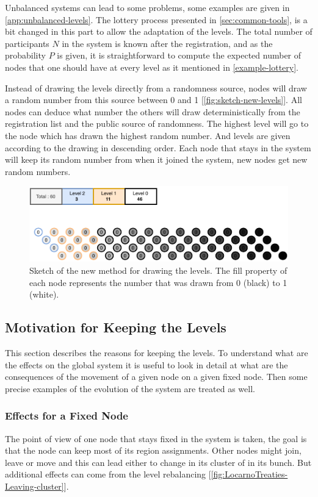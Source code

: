 \documentclass[a4paper,11pt,oneside]{report}
\begin{document}
Unbalanced systems can lead to some problems, some examples are given in \autoref{app:unbalanced-levels}. The lottery process presented in
\autoref{sec:common-tools}, is a bit changed in this part to allow the
adaptation of the levels. The total number of participants $N$ in the system is
known after the registration, and as the probability $P$ is given, it is
straightforward to compute the expected number of nodes that one should have at
every level as it mentioned in \autoref{example-lottery}. 

Instead of drawing the levels directly from a randomness source, nodes will
draw a random number from this source between 0 and 1
[\autoref{fig:sketch-new-levels}]. All nodes can deduce what number the others
will draw deterministically from the registration list and the public source of randomness. The highest level will
go to the node which has drawn the highest random number. And levels are given
according to the drawing in descending order. Each node that stays in the
system will keep its random number from when it joined the system, new nodes
get new random numbers. 

\begin{figure}[!h] 
\centering
\includegraphics[width=400pt]{figures/Lottery-Locarno}
\caption{Sketch of the new method for drawing the levels. The fill property of each node represents
  the number that was drawn from 0 (black) to 1 (white).}
  \label{fig:sketch-new-levels}
\end{figure}


\subsection{Motivation for Keeping the Levels}
This section describes the reasons for keeping the levels. To
understand what are the effects on the global system it is useful to look in
detail at what are the consequences of the movement of a given node on a
given fixed node. Then some precise examples of the evolution of the system are
treated as well. 

\subsubsection{Effects for a Fixed Node} 
The point of view of one node that stays fixed in the system is taken, the goal
is that the node can keep most of its region assignments. Other nodes might
join, leave or move and this can lead either to change in its cluster of in its
bunch. But additional effects can come from the level rebalancing [\autoref{fig:LocarnoTreaties-Leaving-cluster}]. 
\end{document}
